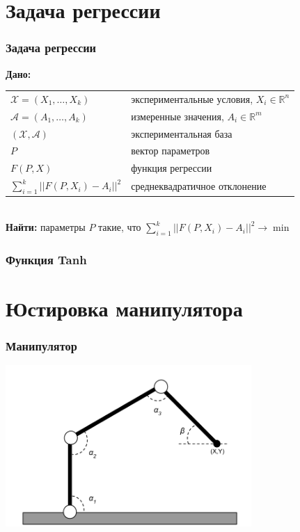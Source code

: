 \documentclass[24pt,pdf,hyperref={unicode},aspectratio=169]{beamer}
\begin{document}
\section{Задача регрессии}

\begin{frame}\frametitle{Задача регрессии}
{\bf Дано:}

\begin{tabular}{p{4cm} p{7cm}}
 $\mathcal{X}=(X_1,\ldots,X_k)$ & экспериментальные условия, $X_i\in\mathbb{R}^n$\\[0.1cm]
 $\mathcal{A}=(A_1,\ldots,A_k)$ & измеренные значения, $A_i\in\mathbb{R}^m$\\[0.1cm]
 $(\mathcal{X},\mathcal{A})$ & экспериментальная база \\[0.1cm]
 $P$ & вектор параметров \\[0.1cm]
 $F(P,X)$ & функция регрессии \\[0.1cm]
 $\sum_{i=1}^{k} ||F(P,X_i)-A_i||^2 $ & среднеквадратичное отклонение\\
 \end{tabular}\\[1cm]
 {\bf Найти:}
 параметры $P$ такие, что $\sum_{i=1}^{k} ||F(P,X_i)-A_i||^2 \rightarrow \min$
\end{frame}

\begin{frame}\frametitle{Функция Tanh}
\end{frame}



\section{Юстировка манипулятора}

\begin{frame}\frametitle{Манипулятор}
\begin{center}
\includegraphics[width=0.7\textwidth]{Images/Manipulator.png}
\end{center}
\end{frame}
\end{document}
